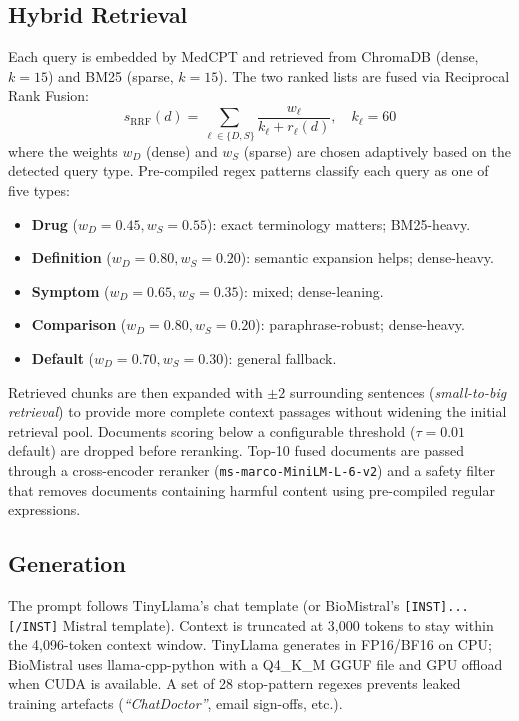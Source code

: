 \documentclass[10pt,twocolumn]{article}
\begin{document}
\subsection{Hybrid Retrieval}
Each query is embedded by MedCPT and retrieved from ChromaDB (dense,
$k=15$) and BM25 (sparse, $k=15$).  The two ranked lists are fused via
Reciprocal Rank Fusion:
\[
  s_{\mathrm{RRF}}(d) = \sum_{\ell \in \{D, S\}} \frac{w_{\ell}}{k_{\ell} + r_{\ell}(d)},
  \quad k_{\ell} = 60
\]
where the weights $w_D$ (dense) and $w_S$ (sparse) are chosen
adaptively based on the detected query type.  Pre-compiled regex patterns
classify each query as one of five types:

\begin{itemize}[noitemsep]
  \item \textbf{Drug} ($w_D=0.45, w_S=0.55$): exact terminology matters; BM25-heavy.
  \item \textbf{Definition} ($w_D=0.80, w_S=0.20$): semantic expansion helps; dense-heavy.
  \item \textbf{Symptom} ($w_D=0.65, w_S=0.35$): mixed; dense-leaning.
  \item \textbf{Comparison} ($w_D=0.80, w_S=0.20$): paraphrase-robust; dense-heavy.
  \item \textbf{Default} ($w_D=0.70, w_S=0.30$): general fallback.
\end{itemize}

Retrieved chunks are then expanded with $\pm 2$ surrounding sentences
(\emph{small-to-big retrieval}) to provide more complete context passages
without widening the initial retrieval pool.  Documents scoring below a
configurable threshold ($\tau = 0.01$ default) are dropped before reranking.
Top-10 fused documents are passed through a cross-encoder reranker
(\texttt{ms-marco-MiniLM-L-6-v2}) and a safety filter that removes documents
containing harmful content using pre-compiled regular expressions.

\subsection{Generation}
The prompt follows TinyLlama's chat template (or BioMistral's
\texttt{[INST]...[/INST]} Mistral template).  Context is truncated at 3,000
tokens to stay within the 4,096-token context window.  TinyLlama generates
in FP16/BF16 on CPU; BioMistral uses llama-cpp-python with a Q4\_K\_M GGUF
file and GPU offload when CUDA is available.  A set of 28 stop-pattern regexes
prevents leaked training artefacts (\emph{``ChatDoctor''}, email sign-offs,
etc.).
\end{document}
